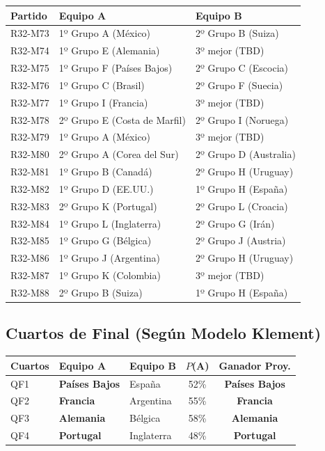 \documentclass[11pt,a4paper]{article}
\begin{document}
\begin{center}
\begin{tabular}{@{}lll@{}}
\toprule
\textbf{Partido} & \textbf{Equipo A} & \textbf{Equipo B} \\
\midrule
\rowcolor{tablerow}
R32-M73 & 1º Grupo A (México) & 2º Grupo B (Suiza) \\
R32-M74 & 1º Grupo E (Alemania) & 3º mejor (TBD) \\
\rowcolor{tablerow}
R32-M75 & 1º Grupo F (Países Bajos) & 2º Grupo C (Escocia) \\
R32-M76 & 1º Grupo C (Brasil) & 2º Grupo F (Suecia) \\
\rowcolor{tablerow}
R32-M77 & 1º Grupo I (Francia) & 3º mejor (TBD) \\
R32-M78 & 2º Grupo E (Costa de Marfil) & 2º Grupo I (Noruega) \\
\rowcolor{tablerow}
R32-M79 & 1º Grupo A (México) & 3º mejor (TBD) \\
R32-M80 & 2º Grupo A (Corea del Sur) & 2º Grupo D (Australia) \\
\rowcolor{tablerow}
R32-M81 & 1º Grupo B (Canadá) & 2º Grupo H (Uruguay) \\
R32-M82 & 1º Grupo D (EE.UU.) & 1º Grupo H (España) \\
\rowcolor{tablerow}
R32-M83 & 2º Grupo K (Portugal) & 2º Grupo L (Croacia) \\
R32-M84 & 1º Grupo L (Inglaterra) & 2º Grupo G (Irán) \\
\rowcolor{tablerow}
R32-M85 & 1º Grupo G (Bélgica) & 2º Grupo J (Austria) \\
R32-M86 & 1º Grupo J (Argentina) & 2º Grupo H (Uruguay) \\
\rowcolor{tablerow}
R32-M87 & 1º Grupo K (Colombia) & 3º mejor (TBD) \\
R32-M88 & 2º Grupo B (Suiza) & 1º Grupo H (España) \\
\bottomrule
\end{tabular}
\end{center}

\subsection{Cuartos de Final (Según Modelo Klement)}

\begin{center}
\begin{tabular}{@{}lllcc@{}}
\toprule
\textbf{Cuartos} & \textbf{Equipo A} & \textbf{Equipo B} & \textbf{$P$(A)} & \textbf{Ganador Proy.} \\
\midrule
\rowcolor{tablerow}
QF1 & \textbf{Países Bajos} & España & 52\% & \textbf{Países Bajos} \\
QF2 & \textbf{Francia} & Argentina & 55\% & \textbf{Francia} \\
\rowcolor{tablerow}
QF3 & \textbf{Alemania} & Bélgica & 58\% & \textbf{Alemania} \\
QF4 & \textbf{Portugal} & Inglaterra & 48\% & \textbf{Portugal} \\
\bottomrule
\end{tabular}
\end{center}
\end{document}
